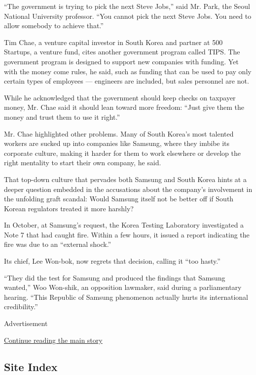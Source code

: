 ``The government is trying to pick the next Steve Jobs,'' said Mr. Park,
the Seoul National University professor. ``You cannot pick the next
Steve Jobs. You need to allow somebody to achieve that.''

Tim Chae, a venture capital investor in South Korea and partner at 500
Startups, a venture fund, cites another government program called TIPS.
The government program is designed to support new companies with
funding. Yet with the money come rules, he said, such as funding that
can be used to pay only certain types of employees --- engineers are
included, but sales personnel are not.

While he acknowledged that the government should keep checks on taxpayer
money, Mr. Chae said it should lean toward more freedom: ``Just give
them the money and trust them to use it right.''

Mr. Chae highlighted other problems. Many of South Korea's most talented
workers are sucked up into companies like Samsung, where they imbibe its
corporate culture, making it harder for them to work elsewhere or
develop the right mentality to start their own company, he said.

That top-down culture that pervades both Samsung and South Korea hints
at a deeper question embedded in the accusations about the company's
involvement in the unfolding graft scandal: Would Samsung itself not be
better off if South Korean regulators treated it more harshly?

In October, at Samsung's request, the Korea Testing Laboratory
investigated a Note 7 that had caught fire. Within a few hours, it
issued a report indicating the fire was due to an ``external shock.''

Its chief, Lee Won-bok, now regrets that decision, calling it ``too
hasty.''

``They did the test for Samsung and produced the findings that Samsung
wanted,'' Woo Won-shik, an opposition lawmaker, said during a
parliamentary hearing. ``This Republic of Samsung phenomenon actually
hurts its international credibility.''

Advertisement

\protect\hyperlink{after-bottom}{Continue reading the main story}

\hypertarget{site-index}{%
\subsection{Site Index}\label{site-index}}

